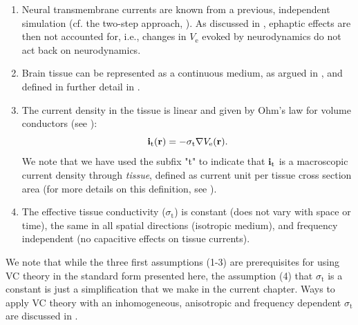 \begin{enumerate}
\item Neural transmembrane currents are known from a previous, 
independent simulation (cf. the two-step approach,  ). 
As discussed in , ephaptic effects are then
not accounted for, i.e., changes in $V_\mathrm{e}$ evoked by neurodynamics 
do not act back on neurodynamics.

\item Brain tissue can be represented as a continuous 
medium, as argued in , 
and defined in further detail in . 

\item The current density in the tissue is linear and given by 
Ohm's law for volume conductors (see ):
\begin{equation}
{\bf i}_\mathrm{t}({\bf r}) = - \sigma_\mathrm{t} \nabla V_\mathrm{e}({\bf r}).
\label{eq:VC:ohmici}
\end{equation}
We note that we have used the subfix "t" to indicate that ${\bf i}_\mathrm{t}$ is a macroscopic current density through \textit{tissue}, defined as current unit per tissue cross section area (for more details on this definition, see ).

\item The effective tissue conductivity ($\sigma_\mathrm{t}$) is constant (does not vary with space or time), 
the same in all spatial directions (isotropic medium), and frequency independent (no capacitive effects on tissue currents).
\end{enumerate}

We note that while the three first assumptions (1-3) are prerequisites for using VC theory in the standard form presented here, the assumption (4) that $\sigma_\mathrm{t}$ is a constant is just a simplification that we make in the current chapter. Ways to apply VC theory with an inhomogeneous, anisotropic and frequency dependent $\sigma_\mathrm{t}$ are discussed in .


